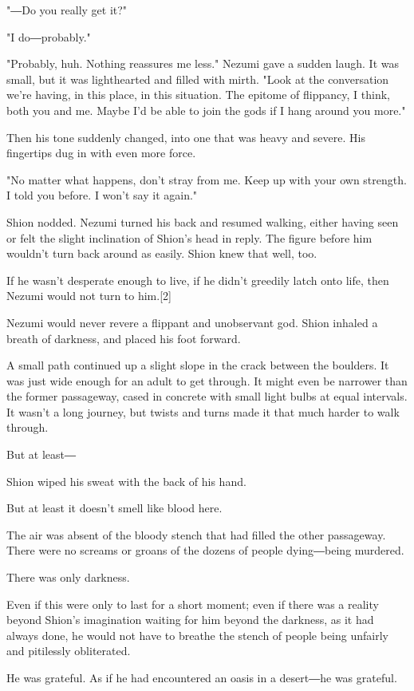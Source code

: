 "―Do you really get it?"

"I do―probably."

"Probably, huh. Nothing reassures me less." Nezumi gave a sudden laugh.
It was small, but it was lighthearted and filled with mirth. "Look at
the conversation we're having, in this place, in this situation. The
epitome of flippancy, I think, both you and me. Maybe I'd be able to
join the gods if I hang around you more."

Then his tone suddenly changed, into one that was heavy and severe. His
fingertips dug in with even more force.

"No matter what happens, don't stray from me. Keep up with your own
strength. I told you before. I won't say it again."

Shion nodded. Nezumi turned his back and resumed walking, either having
seen or felt the slight inclination of Shion's head in reply. The figure
before him wouldn't turn back around as easily. Shion knew that well,
too.

If he wasn't desperate enough to live, if he didn't greedily latch onto
life, then Nezumi would not turn to him.{[}2{]}

Nezumi would never revere a flippant and unobservant god. Shion inhaled
a breath of darkness, and placed his foot forward.

A small path continued up a slight slope in the crack between the
boulders. It was just wide enough for an adult to get through. It might
even be narrower than the former passageway, cased in concrete with
small light bulbs at equal intervals. It wasn't a long journey, but
twists and turns made it that much harder to walk through.

But at least―

Shion wiped his sweat with the back of his hand.

But at least it doesn't smell like blood here.

The air was absent of the bloody stench that had filled the other
passageway. There were no screams or groans of the dozens of people
dying―being murdered.

There was only darkness.

Even if this were only to last for a short moment; even if there was a
reality beyond Shion's imagination waiting for him beyond the darkness,
as it had always done, he would not have to breathe the stench of people
being unfairly and pitilessly obliterated.

He was grateful. As if he had encountered an oasis in a desert―he was
grateful.

